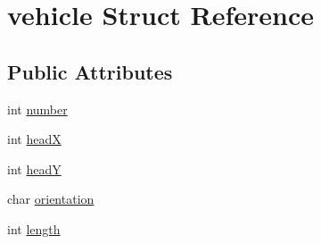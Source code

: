 \hypertarget{structvehicle}{\section{vehicle Struct Reference}
\label{structvehicle}
}
\subsection*{Public Attributes}
\begin{DoxyCompactItemize}
\item 
int \hyperlink{structvehicle_a0499f4add2a85479bfb87f18f9bcab9e}{number}
\item 
int \hyperlink{structvehicle_ab525f11ff214cc0bb23e7ddb9f8265ad}{head\-X}
\item 
int \hyperlink{structvehicle_a63b425a69ba561fcaa9176eebd282f93}{head\-Y}
\item 
char \hyperlink{structvehicle_a79550d470251103a9634b1393e83317d}{orientation}
\item 
int \hyperlink{structvehicle_ac24eafe4009bbc892ddeb9f522cd7cd0}{length}
\end{DoxyCompactItemize}



